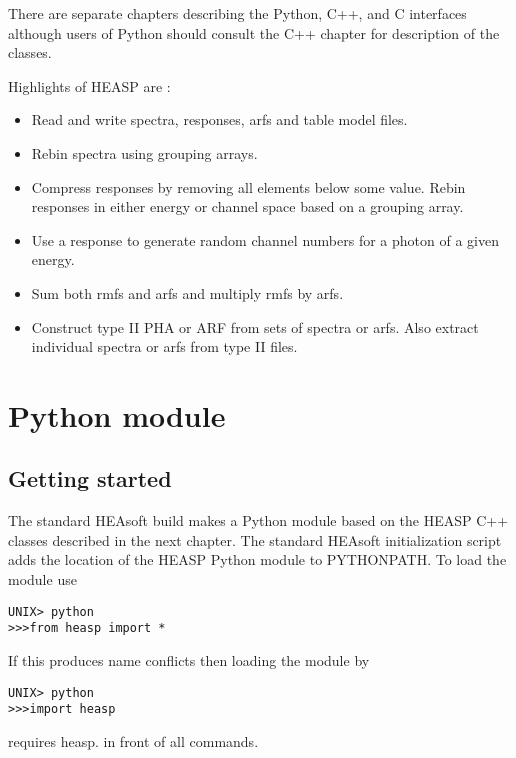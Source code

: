 \documentclass[11pt]{book}
\begin{document}
There are separate chapters describing the Python, C++, and C
interfaces although users of Python should consult the C++ chapter for
description of the classes.

Highlights of HEASP are :
\begin{itemize}

\item Read and write spectra, responses, arfs and table model files.

\item Rebin spectra using grouping arrays.

\item Compress responses by removing all elements below some
  value. Rebin responses in either energy or channel space based on a
  grouping array.

\item Use a response to generate random channel numbers for a photon
  of a given energy.

\item Sum both rmfs and arfs and multiply rmfs by arfs.

\item Construct type II PHA or ARF from sets of spectra or arfs. Also
  extract individual spectra or arfs from type II files.

\end{itemize}




\chapter{Python module}

\section{Getting started}

The standard HEAsoft build makes a Python module based on the HEASP
C++ classes described in the next chapter. The standard HEAsoft
initialization script adds the location of the HEASP Python module to
PYTHONPATH. To load the module use
\begin{verbatim}
UNIX> python
>>>from heasp import *
\end{verbatim}
If this produces name conflicts then loading the module by
\begin{verbatim}
UNIX> python
>>>import heasp
\end{verbatim}
requires heasp. in front of all commands.
\end{document}
